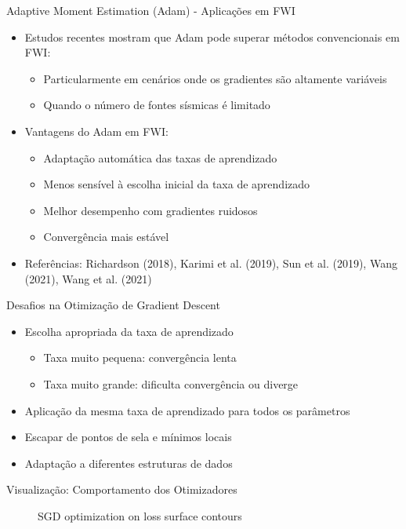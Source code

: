 \documentclass[aspectratio=1610]{beamer}
\begin{document}
\begin{frame}{Adaptive Moment Estimation (Adam) - Aplicações em FWI}
\begin{itemize}
    \item Estudos recentes mostram que Adam pode superar métodos convencionais em FWI:
    \begin{itemize}
        \item Particularmente em cenários onde os gradientes são altamente variáveis
        \item Quando o número de fontes sísmicas é limitado
    \end{itemize}
    \item Vantagens do Adam em FWI:
    \begin{itemize}
        \item Adaptação automática das taxas de aprendizado
        \item Menos sensível à escolha inicial da taxa de aprendizado
        \item Melhor desempenho com gradientes ruidosos
        \item Convergência mais estável
    \end{itemize}
    \item Referências: Richardson (2018), Karimi et al. (2019), Sun et al. (2019), Wang (2021), Wang et al. (2021)
\end{itemize}
\end{frame}

\begin{frame}{Desafios na Otimização de Gradient Descent}
\begin{itemize}
    \item Escolha apropriada da taxa de aprendizado
    \begin{itemize}
        \item Taxa muito pequena: convergência lenta
        \item Taxa muito grande: dificulta convergência ou diverge
    \end{itemize}
    \item Aplicação da mesma taxa de aprendizado para todos os parâmetros
    \item Escapar de pontos de sela e mínimos locais
    \item Adaptação a diferentes estruturas de dados
\end{itemize}
\end{frame}

\begin{frame}{Visualização: Comportamento dos Otimizadores}
\begin{figure}
\centering
{}
\caption{SGD optimization on loss surface contours}
\end{figure}
\end{frame}
\end{document}
